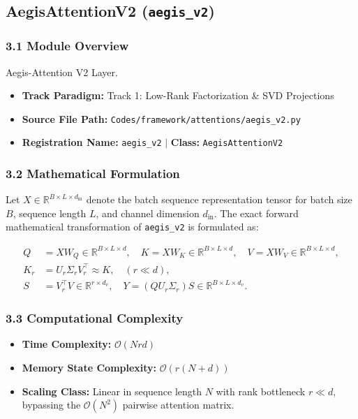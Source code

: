 \subsection{AegisAttentionV2 (\texttt{aegis\_v2})}
\label{sec:app_module_aegis_v2}

\subsubsection*{3.1 Module Overview}
Aegis-Attention V2 Layer.
\begin{itemize}
    \item \textbf{Track Paradigm:} Track 1: Low-Rank Factorization \& SVD Projections
    \item \textbf{Source File Path:} \texttt{Codes/framework/attentions/aegis\_v2.py}
    \item \textbf{Registration Name:} \texttt{aegis\_v2} $\mid$ \textbf{Class:} \texttt{AegisAttentionV2}
\end{itemize}

\subsubsection*{3.2 Mathematical Formulation}
Let $X \in \mathbb{R}^{B \times L \times d_{\text{in}}}$ denote the batch sequence representation tensor for batch size $B$, sequence length $L$, and channel dimension $d_{\text{in}}$. The exact forward mathematical transformation of \texttt{aegis\_v2} is formulated as:

\begin{align}
Q &= X W_Q \in \mathbb{R}^{B \times L \times d}, \quad K = X W_K \in \mathbb{R}^{B \times L \times d}, \quad V = X W_V \in \mathbb{R}^{B \times L \times d}, \\
K_r &= U_r \Sigma_r V_r^\top \approx K, \quad (r \ll d), \\
S &= V_r^\top V \in \mathbb{R}^{r \times d_v}, \quad Y = (Q U_r \Sigma_r) S \in \mathbb{R}^{B \times L \times d_v}.
\end{align}


\subsubsection*{3.3 Computational Complexity}
\begin{itemize}
    \item \textbf{Time Complexity:} $\mathcal{O}(N r d)$
    \item \textbf{Memory State Complexity:} $\mathcal{O}(r(N + d))$
    \item \textbf{Scaling Class:} Linear in sequence length $N$ with rank bottleneck $r \ll d$, bypassing the $\mathcal{O}(N^2)$ pairwise attention matrix.
\end{itemize}

